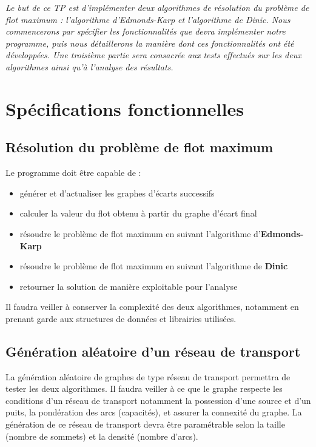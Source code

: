 \textit{Le but de ce TP est d'implémenter deux algorithmes de résolution du problème de flot maximum : l'algorithme d'Edmonds-Karp et l'algorithme de Dinic. Nous commencerons par spécifier les fonctionnalités que devra implémenter notre programme, puis nous détaillerons la manière dont ces fonctionnalités ont été développées. Une troisième partie sera consacrée aux tests effectués sur les deux algorithmes ainsi qu'à l'analyse des résultats.}

\section{Spécifications fonctionnelles}

\subsection{Résolution du problème de flot maximum}

Le programme doit être capable de :
\begin{itemize}
\item générer et d'actualiser les graphes d'écarts successifs
\item calculer la valeur du flot obtenu à partir du graphe d'écart final
\item résoudre le problème de flot maximum en suivant l'algorithme d'\textbf{Edmonds-Karp}
\item résoudre le problème de flot maximum en suivant l'algorithme de \textbf{Dinic}
\item retourner la solution de manière exploitable pour l'analyse
\end{itemize}

Il faudra veiller à conserver la complexité des deux algorithmes, notamment en prenant garde aux structures de données et librairies utilisées.

\subsection{Génération aléatoire d'un réseau de transport}

La génération aléatoire de graphes de type réseau de transport permettra de tester les deux algorithmes. Il faudra veiller à ce que le graphe respecte les conditions d'un réseau de transport notamment la possession d'une source et d'un puits, la pondération des arcs (capacités), et assurer la connexité du graphe. La génération de ce réseau de transport devra être paramétrable selon la taille (nombre de sommets) et la densité (nombre d'arcs).


